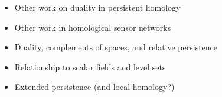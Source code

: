\begin{itemize}
  \item Other work on duality in persistent homology
  \item Other work in homological sensor networks
  \item Duality, complements of spaces, and relative persistence
  \item Relationship to scalar fields and level sets
  \item Extended persistence (and local homology?)
\end{itemize}
